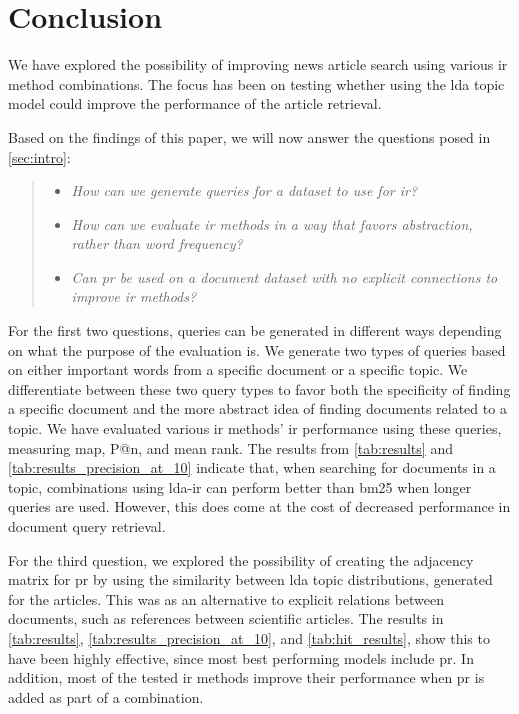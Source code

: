 \section{Conclusion}\label{sec:conclusion}
We have explored the possibility of improving news article search using various \gls{ir} method combinations.
The focus has been on testing whether using the \gls{lda} topic model could improve the performance of the article retrieval.

Based on the findings of this paper, we will now answer the questions posed in \autoref{sec:intro}:
\begin{quote}
	\begin{itemize}
		\item \emph{How can we generate queries for a dataset to use for \gls{ir}?}
		\item \emph{How can we evaluate \gls{ir} methods in a way that favors abstraction, rather than word frequency?}
		\item \emph{Can \gls{pr} be used on a document dataset with no explicit connections to improve \gls{ir} methods?}
	\end{itemize}
\end{quote}

For the first two questions, queries can be generated in different ways depending on what the purpose of the evaluation is.
We generate two types of queries based on either important words from a specific document or a specific topic.
We differentiate between these two query types to favor both the specificity of finding a specific document and the more abstract idea of finding documents related to a topic.
We have evaluated various \gls{ir} methods' \gls{ir} performance using these queries, measuring \acrlong{map}, P@n, and mean rank.
The results from \autoref{tab:results} and \autoref{tab:results_precision_at_10} indicate that, when searching for documents in a topic, combinations using \gls{lda}-\gls{ir} can perform better than \gls{bm25} when longer queries are used.
However, this does come at the cost of decreased performance in document query retrieval.

For the third question, we explored the possibility of creating the adjacency matrix for \gls{pr} by using the similarity between \gls{lda} topic distributions, generated for the articles.
This was as an alternative to explicit relations between documents, such as references between scientific articles.
The results in \autoref{tab:results}, \autoref{tab:results_precision_at_10}, and \autoref{tab:hit_results}, show this to have been highly effective, since most best performing models include \gls{pr}.
In addition, most of the tested \gls{ir} methods improve their performance when \gls{pr} is added as part of a combination.
